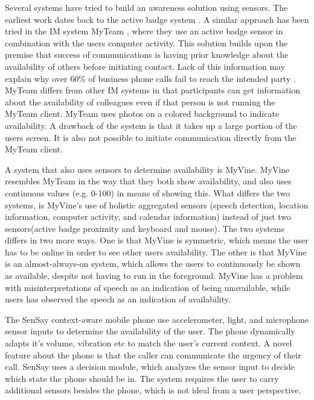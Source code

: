 \documentclass{sigchi}
\begin{document}
Several systems have tried to build an awareness solution using sensors.
The earliest work dates back to the active badge system \cite{want1992active}.
A similar approach has been tried in the IM system MyTeam \cite{lai2003myteam}, where they use an active badge sensor in combination with the users computer activity.
This solution builds upon the premise that success of communications is having prior knowledge about the availability of others before initiating contact.
Lack of this information may explain why over 60\% of business phone calls fail to reach the intended party \cite{whittaker1995rethinking}.
MyTeam differs from other IM systems in that participants can get information about the availability of colleagues even if that person is not running the MyTeam client.
MyTeam uses photos on a colored background to indicate availability.
A drawback of the system is that it takes up a large portion of the users screen. It is also not possible to initiate communication directly from the MyTeam client.

A system that also uses sensors to determine availability is MyVine\cite{fogarty2004myvine}.
MyVine resembles MyTeam in the way that they both show availability, and also uses continuous values (e.g. 0-100) in means of showing this.
What differs the two systems, is MyVine’s use of holistic aggregated sensors (speech
detection, location information, computer activity, and calendar information) instead of just two sensors(active badge proximity and keyboard and mouse).
The two systems differs in two more ways.
One is that MyVine is symmetric, which means the user has to be online in order to see other users availability.
The other is that MyVine is an almost-always-on system, which allows the users to continuously be shown as available, despite not having to run in the foreground.
MyVine has a problem with misinterpretations of speech as an indication of being unavailable, while users has observed the speech as an indication of availability.

The SenSay context-aware mobile phone \cite{siewiorek2003sensay} use accelerometer, light, and microphone sensor inputs to determine the availability of the user.
The phone dynamically adapts it’s volume, vibration etc to match the user's current context.
A novel feature about the phone is that the caller can communicate the urgency of their call.
SenSay uses a decision module, which analyzes the sensor input to decide which state the phone should be in.
The system requires the user to carry additional sensors besides the phone, which is not ideal from a user perspective.
\end{document}
